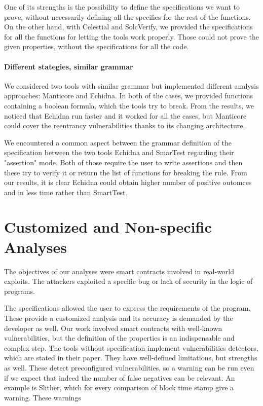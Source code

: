 One of its strengths is the possibility to define the specifications we want to prove, without necessarily defining all the specifics for the rest of the functions.
On the other hand,  with Celestial and SolcVerify, we provided the specifications for all the functions for letting the tools work properly. 
Those could not prove the given properties, without the specifications for all the code.

\paragraph{Different stategies, similar grammar}
We considered two tools with similar grammar but implemented different analysis approaches: Manticore and Echidna. 
In both of the cases, we provided functions containing a boolean formula, which the tools try to break. From the results, 
we noticed that Echidna run faster and it worked for all the cases, but Manticore could cover the reentrancy vulnerabilities thanks to its changing architecture.

We encountered a common aspect between the grammar definition of the specification between the two tools Echidna and SmarTest regarding their "assertion" mode. 
Both of those require the user to write assertions and then these try to verify it or return the list of 
functions for breaking the rule. From our results, it is clear Echidna could obtain higher number of positive outomces and in less time rather than SmartTest.



\section{Customized and Non-specific Analyses} 
The objectives of our analyses were smart contracts involved in real-world exploits. The attackers exploited a specific bug or lack of security in the logic of programs. 

The specifications allowed the user to express the requirements of the program. These provide a customized analysis and 
its accuracy is demanded by the developer as well. 
Our work involved smart contracts with well-known vulnerabilities, but the definition of the properties is an indispensable and complex step.
The tools without specification implement vulnerabilities detectors, which are stated in their paper. They have well-defined limitations, but strengths as well. These detect preconfigured vulnerabilities, so a warning can be run even if we expect that indeed the number of false negatives can be relevant.
An example is Slither, which for every comparison of block time stamp give a warning. These warnings 

